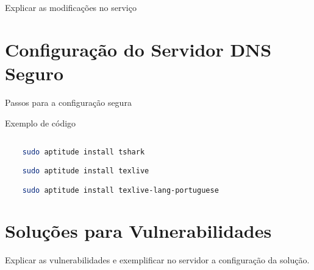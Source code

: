 \documentclass[a4paper]{report} %
\begin{document}
Explicar as modificações no serviço

\section{Configuração do Servidor DNS Seguro}
\label{sec_config_segura}

Passos para a configuração segura

Exemplo de código
\begin{lstlisting}[language=bash]

	sudo aptitude install tshark

	sudo aptitude install texlive

	sudo aptitude install texlive-lang-portuguese

\end{lstlisting}

\section{Soluções para Vulnerabilidades }
\label{sec_solucoes}

Explicar as vulnerabilidades e exemplificar no servidor a configuração da solução.


\begin{thebibliography}{99}
\end{thebibliography}

\end{document}
